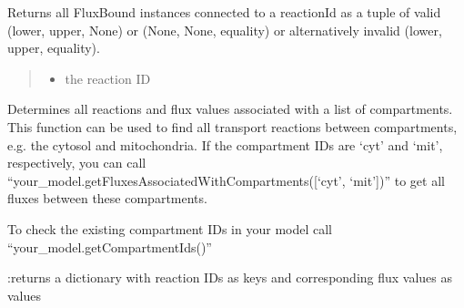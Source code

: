 \documentclass[letterpaper,10pt,english]{sphinxmanual}
\begin{document}
\begin{fulllineitems}
\begin{fulllineitems}
\label{\detokenize{modules_doc:cbmpy.CBModel.Model.getFluxBoundsByReactionID}}
\pysigstartsignatures
{}
\pysigstopsignatures
\sphinxAtStartPar
Returns all FluxBound instances connected to a reactionId as a tuple of valid
(lower, upper, None) or (None, None, equality) or alternatively invalid (lower, upper, equality).
\begin{quote}
\begin{itemize}
\item {} 
\sphinxAtStartPar
{} the reaction ID

\end{itemize}

\sphinxAtStartPar
{}
\end{quote}

\end{fulllineitems}


\begin{fulllineitems}
\label{\detokenize{modules_doc:cbmpy.CBModel.Model.getFluxesAssociatedWithCompartments}}
\pysigstartsignatures
{}
\pysigstopsignatures
\sphinxAtStartPar
Determines all reactions and flux values associated with a list of
compartments. This function can be used to find all transport reactions
between compartments, e.g. the cytosol and mitochondria. If the
compartment IDs are ‘cyt’ and ‘mit’, respectively, you can call
“your\_model.getFluxesAssociatedWithCompartments({[}‘cyt’, ‘mit’{]})”
to get all fluxes between these compartments.
\begin{description}
\sphinxAtStartPar
To check the existing compartment IDs in your model
call “your\_model.getCompartmentIds()”

\end{description}

\sphinxAtStartPar
:returns a dictionary with reaction IDs as keys and corresponding
flux values as values

\end{fulllineitems}


\end{fulllineitems}
\end{document}
